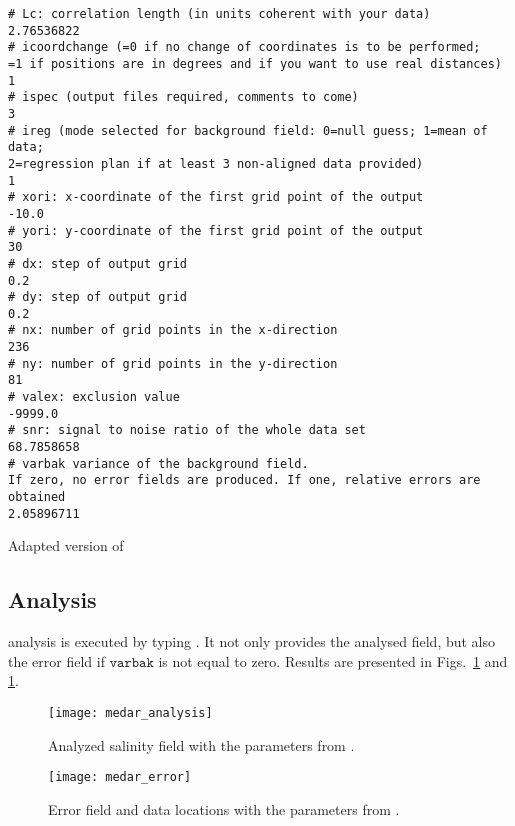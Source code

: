 \begin{exfile}[htpb]
\begin{footnotesize}
\begin{verbatim}
# Lc: correlation length (in units coherent with your data)
2.76536822
# icoordchange (=0 if no change of coordinates is to be performed; 
=1 if positions are in degrees and if you want to use real distances)
1
# ispec (output files required, comments to come)
3
# ireg (mode selected for background field: 0=null guess; 1=mean of data; 
2=regression plan if at least 3 non-aligned data provided)
1
# xori: x-coordinate of the first grid point of the output
-10.0
# yori: y-coordinate of the first grid point of the output
30
# dx: step of output grid
0.2
# dy: step of output grid
0.2
# nx: number of grid points in the x-direction
236
# ny: number of grid points in the y-direction
81
# valex: exclusion value
-9999.0
# snr: signal to noise ratio of the whole data set
68.7858658   
# varbak variance of the background field. 
If zero, no error fields are produced. If one, relative errors are obtained
2.05896711
\end{verbatim}
\end{footnotesize}
\caption{Adapted version of \label{paramfileCL2}}
\end{exfile}

\subsection{Analysis}

\diva analysis is executed by typing . It not only provides the analysed field, but also the error field if $\texttt{varbak}$ is not equal to zero. Results are presented in Figs.~\ref{analysisCL1} and \ref{analysisCL1}.

\begin{figure}[htpb]
\centering
\texttt{[image: medar\_analysis]}
\caption{Analyzed salinity field with the parameters from .\label{analysisCL1}}
\end{figure}


\begin{figure}[htpb]
\centering
\texttt{[image: medar\_error]}
\caption{Error field and data locations with the parameters from .\label{errorCL1}}
\end{figure}



\clearpage
%


